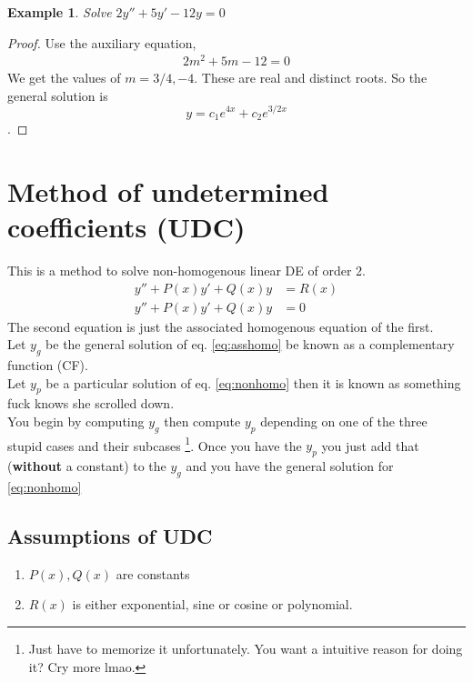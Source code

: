 \documentclass[oneside,11pt,pdftex,final]{book}%
\numberwithin{equation}{section}
\newtheorem{example}[theorem]{Example}
\numberwithin{section}{chapter}
\numberwithin{equation}{chapter}
\begin{document}
\begin{example}
	Solve $ 2y''+5y'-12y=0 $
\end{example}
\begin{proof}
	Use the auxiliary equation,
	\begin{align*}
		2m^2+5m-12=0
	\end{align*}
We get the values of $ m=3/4, -4 $. These are real and distinct roots. So the general solution is \[ y=c_1 e^{4x}+c_2e^{3/2x} \].
\end{proof}

\section{Method of undetermined coefficients (UDC)}
This is a method to solve non-homogenous linear DE of order 2.
\begin{align}
	y''+P(x)y'+Q(x)y&=R(x)\label{eq:nonhomo}\\
		y''+P(x)y'+Q(x)y&=0 \label{eq:asshomo}
\end{align}
The second equation is just the associated homogenous equation of the first.\\
Let $ y_g $ be the general solution of eq. \ref{eq:asshomo} be known as a complementary function (CF).\\
Let $ y_p $ be a particular solution of eq. \ref{eq:nonhomo} then it is known as something fuck knows she scrolled down.
\\
You begin by computing $ y_g $ then compute $ y_p $ depending on one of the three stupid cases and their subcases \footnote{Just have to memorize it unfortunately. You want a intuitive reason for doing it? Cry more lmao.}. Once you have the $ y_p $ you just add that (\textbf{without} a constant) to the $ y_g $ and you have the general solution for \ref{eq:nonhomo}
\subsection{Assumptions of UDC}
\begin{enumerate}
	\item $ P(x),Q(x) $ are constants
	\item $ R(x) $ is either exponential, sine or cosine or polynomial.
\end{enumerate}
\end{document}
